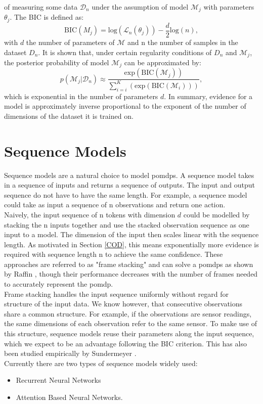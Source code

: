 of measuring some data $\mathcal{D}_n$ under the assumption of model $\mathcal{M}_j$ with parameters $\theta_j$. The BIC is defined as:
\begin{equation}
    \mathrm{BIC}(M_j) = \text{log}(\mathcal{L}_n(\theta_j)) - \frac{d}{2} \text{log}(n),
\end{equation}
with $d$ the number of parameters of $\mathcal{M}$ and n the number of samples in the dataset $D_n$.
It is shown that, under certain regularity conditions of $D_n$ and $\mathcal{M}_j$, the posterior probability of model $\mathcal{M}_j$ can be approximated by:
\begin{equation}
    p(\mathcal{M}_j|\mathcal{D}_n) \approx \frac{\text{exp}(\mathrm{BIC}(\mathcal{M}_j))}{\sum_{i=i}^K(\text{exp}(\mathrm{BIC}(\mathcal{M}_i)))},
\end{equation}
which is exponential in the number of parameters $d$.
In summary, evidence for a model is approximately inverse proportional to the exponent of the number of dimensions of the dataset it is trained on.

\section{Sequence Models}
Sequence models are a natural choice to model \ac{pomdp}s. 
A sequence model takes in a sequence of inputs and returns a sequence of outputs. The input and output sequence do not have to have the same length. For example, 
a sequence model could take as input a sequence of n observations and return one action. \\ 
Naively, the input sequence of n tokens with dimension $d$ could be modelled  by stacking the n inputs together and use the stacked observation sequence as one 
input to a model. The dimension of the input then scales linear with the sequence length. As motivated in Section \ref{COD}, this means exponentially more evidence is 
required with sequence length n to achieve the same confidence. These approaches are referred to as "frame stacking" and can solve a \ac{pomdp}s as shown by Raffin 
\cite{framestacking}, though 
their performance decreases with the number of frames needed to accurately represent the \ac{pomdp}. \\
Frame stacking handles the input sequence uniformly without regard for structure of the input data. We know however, that consecutive observations share a common 
structure. For example, if the observations are sensor readings, the same dimensions of each observation refer to the same sensor. To make use of this structure, 
sequence models reuse their parameters along the input sequence, which we expect to be an advantage following the BIC criterion. This has also been studied empirically 
by Sundermeyer \etAl \cite{6639310}.\\
Currently there are two types of sequence models widely used:
\begin{itemize}
    \item Recurrent Neural Networks
    \item Attention Based Neural Networks.
\end{itemize}

